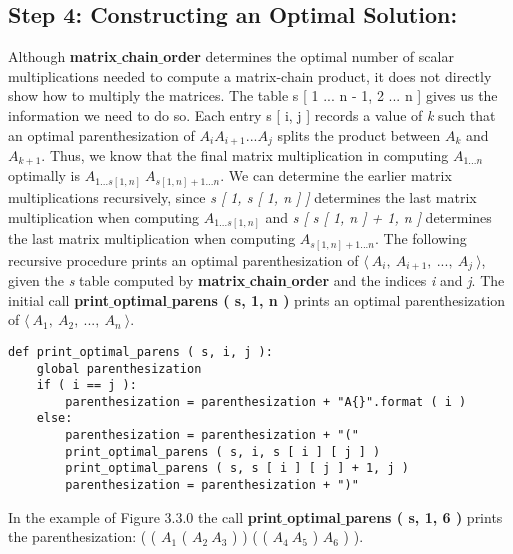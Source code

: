 \subsection{Step 4: Constructing an Optimal Solution:}

Although {\bfseries matrix$\_$chain$\_$order} determines the optimal number of scalar multiplications needed to compute a matrix-chain product, it does not directly show how to multiply the matrices. The table s [ 1 ... n - 1, 2 ... n ] gives us the information we need to do so. Each entry s [ i, j ] records a value of {\itshape k} such that an optimal parenthesization of $A_{i} A_{i+1} ... A_{j}$ splits the product between $A_{k}$ and $A_{k+1}$. Thus, we know that the final matrix multiplication in computing $A_{1 ... n}$ optimally is $A_{1...s[1,n]}\ A_{s[1,n] + 1 ...n}$. We can determine the earlier matrix multiplications recursively, since {\itshape s [ 1, s [ 1, n ] ]} determines the last matrix multiplication when computing $A_{1...s[1,n]}$ and {\itshape s [ s [ 1, n ] + 1, n ]} determines the last matrix multiplication when computing $A_{s[1,n] + 1 ...n}$. The following recursive procedure prints an optimal parenthesization of $\langle\ A_{i},\ A_{i+1},\ ...,\ A_{j}\ \rangle$, given the {\itshape s} table computed by {\bfseries matrix$\_$chain$\_$order} and the indices {\itshape i} and {\itshape j}. The initial call {\bfseries print$\_$optimal$\_$parens ( s, 1, n )} prints an optimal parenthesization of $\langle\ A_{1},\ A_{2},\ ...,\ A_{n}\ \rangle$. \hfill \break

\begin{lstlisting}
def print_optimal_parens ( s, i, j ):
    global parenthesization
    if ( i == j ):
        parenthesization = parenthesization + "A{}".format ( i )
    else:
        parenthesization = parenthesization + "("
        print_optimal_parens ( s, i, s [ i ] [ j ] )
        print_optimal_parens ( s, s [ i ] [ j ] + 1, j )
        parenthesization = parenthesization + ")"
\end{lstlisting} \hfill

In the example of Figure 3.3.0 the call {\bfseries print$\_$optimal$\_$parens ( s, 1, 6 )} prints the parenthesization: \linebreak ( ( $A_{1}$ ( $A_{2}\ A_{3}$ ) ) ( ( $A_{4}\ A_{5}$ ) $A_{6}$ ) ).

\pagebreak